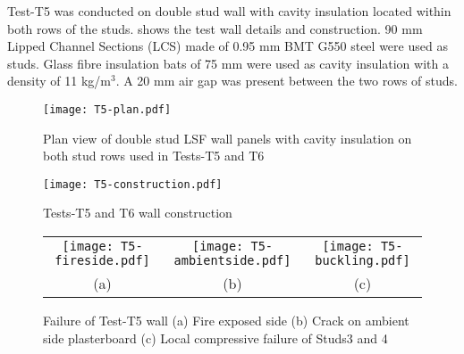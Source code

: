Test-T5 was conducted on double stud wall with cavity insulation located within both rows of the studs.  shows the test wall details and construction. 90 mm Lipped Channel Sections (LCS) made of 0.95 mm BMT G550 steel were used as studs. Glass fibre insulation bats of 75 mm were used as cavity insulation with a density of 11 kg/m\(^3\). A 20 mm air gap was present between the two rows of studs.
\begin{figure}[htbp]
	\centering
		\texttt{[image: T5-plan.pdf]}
		\caption{Plan view of double stud LSF wall panels with cavity insulation on both stud rows used in Tests-T5 and T6}
		\label{fig:T5-plan}
\end{figure} 
\begin{figure}[htbp]
	\centering
	\texttt{[image: T5-construction.pdf]}
	\caption{Tests-T5 and T6 wall construction}
	\label{fig:T5-construction}
\end{figure} 
\begin{figure}[!htbp]
	\centering	
		\begin{tabular}{ccc}
			\texttt{[image: T5-fireside.pdf]} & 
			\texttt{[image: T5-ambientside.pdf]} & 
			\texttt{[image: T5-buckling.pdf]} \\
			(a) & (b) & (c) \\
			\end{tabular}
		\caption{Failure of Test-T5 wall (a) Fire exposed side (b) Crack on ambient side plasterboard (c) Local compressive failure of Studs3 and 4}
		\label{fig:T5-failure}
\end{figure} 

